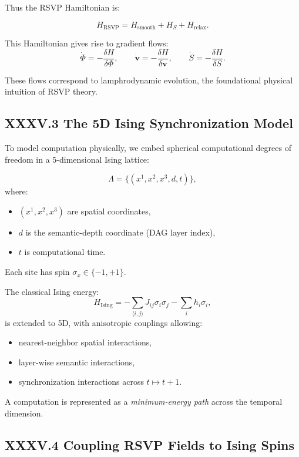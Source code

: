 \documentclass[12pt,letterpaper]{article}
\begin{document}
Thus the RSVP Hamiltonian is:

\[
\boxed{
H_{\text{RSVP}}
= H_{\text{smooth}} + H_S + H_{\text{relax}}.
}
\]

This Hamiltonian gives rise to gradient flows:
\[
\dot{\Phi} = -\frac{\delta H}{\delta \Phi}, \qquad
\dot{\mathbf{v}} = -\frac{\delta H}{\delta \mathbf{v}}, \qquad
\dot{S} = -\frac{\delta H}{\delta S}.
\]

These flows correspond to lamphrodynamic evolution, 
the foundational physical intuition of RSVP theory.

\subsection{XXXV.3 The 5D Ising Synchronization Model}

To model computation physically, we embed spherical computational degrees of freedom 
in a 5-dimensional Ising lattice:

\[
\Lambda = \{(x^1,x^2,x^3,d,t)\},
\]
where:

\begin{itemize}
  \item $(x^1,x^2,x^3)$ are spatial coordinates,
  \item $d$ is the semantic-depth coordinate (DAG layer index),
  \item $t$ is computational time.
\end{itemize}

Each site has spin $\sigma_{x} \in \{-1, +1\}$.  

The classical Ising energy:
\[
H_{\text{Ising}}
=
-\sum_{\langle i,j\rangle} J_{ij} \sigma_i \sigma_j
- \sum_i h_i \sigma_i,
\]
is extended to 5D, with anisotropic couplings allowing:

\begin{itemize}
    \item nearest-neighbor spatial interactions,
    \item layer-wise semantic interactions,
    \item synchronization interactions across $t \mapsto t+1$.
\end{itemize}

A computation is represented as a \emph{minimum-energy path} across the temporal dimension.

\subsection{XXXV.4 Coupling RSVP Fields to Ising Spins}
\end{document}
